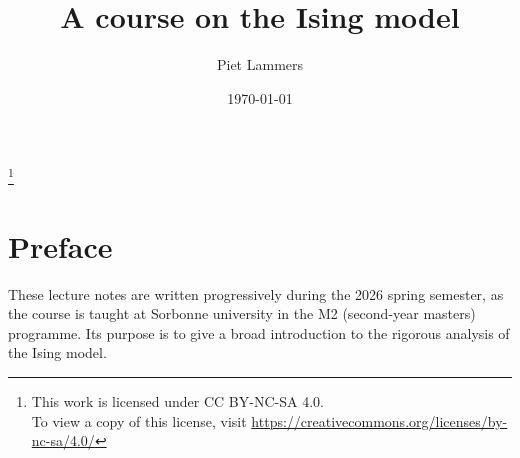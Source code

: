 % 


\makeatletter
{}
\makeatother

\title{A course on the Ising model}

\author{Piet Lammers}
\address{CNRS and Sorbonne Université, LPSM}

\date{\today}

\newcommand\n{\mathbf{n}}
\newcommand\m{\mathbf{m}}
\newcommand\s{\mathbf{s}}
\renewcommand\a{\mathbf{a}}
\renewcommand\b{\mathbf{b}}
\newcommand\f{{\operatorname{f}}}
\newcommand\bfM{\mathbf{M}}
\newcommand\bfP{\mathbf{P}}

\thanks{This work is licensed under CC BY-NC-SA 4.0.\\\indent To view a copy of this
license, visit \url{https://creativecommons.org/licenses/by-nc-sa/4.0/}}



\maketitle

\tableofcontents

\section*{Preface}
These lecture notes are written progressively during the 2026 spring semester,
as the course is taught at Sorbonne university in the M2 (second-year masters) programme.
Its purpose is to give a broad introduction to the rigorous analysis of the Ising model.



